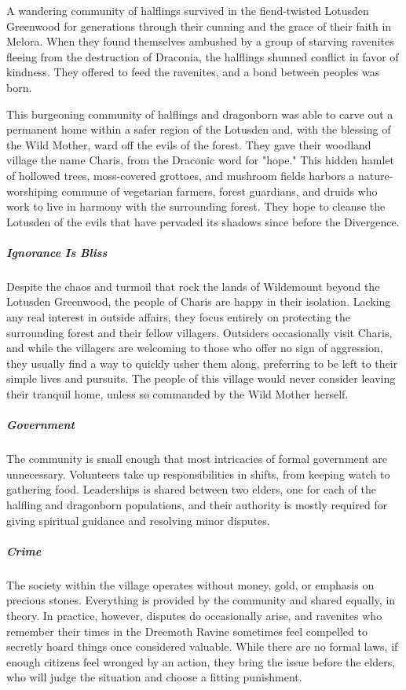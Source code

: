 \documentclass[10pt,a4paper,twoside,bg=print,twocolumn,openany,nodeprecatedcode]{dndbook}
\begin{document}
A wandering community of halflings survived in the fiend-twisted Lotusden Greenwood for generations through their cunning and the grace of their faith in Melora. When they found themselves ambushed by a group of starving ravenites fleeing from the destruction of Draconia, the halflings shunned conflict in favor of kindness. They offered to feed the ravenites, and a bond between peoples was born.

This burgeoning community of halflings and dragonborn was able to carve out a permanent home within a safer region of the Lotusden and, with the blessing of the Wild Mother, ward off the evils of the forest. They gave their woodland village the name Charis, from the Draconic word for "hope." This hidden hamlet of hollowed trees, moss-covered grottoes, and mushroom fields harbors a nature-worshiping commune of vegetarian farmers, forest guardians, and druids who work to live in harmony with the surrounding forest. They hope to cleanse the Lotusden of the evils that have pervaded its shadows since before the Divergence.

\subparagraph{Ignorance Is Bliss}
Despite the chaos and turmoil that rock the lands of Wildemount beyond the Lotusden Greenwood, the people of Charis are happy in their isolation. Lacking any real interest in outside affairs, they focus entirely on protecting the surrounding forest and their fellow villagers. Outsiders occasionally visit Charis, and while the villagers are welcoming to those who offer no sign of aggression, they usually find a way to quickly usher them along, preferring to be left to their simple lives and pursuits. The people of this village would never consider leaving their tranquil home, unless so commanded by the Wild Mother herself.

\subparagraph{Government}
The community is small enough that most intricacies of formal government are unnecessary. Volunteers take up responsibilities in shifts, from keeping watch to gathering food. Leaderships is shared between two elders, one for each of the halfling and dragonborn populations, and their authority is mostly required for giving spiritual guidance and resolving minor disputes.

\subparagraph{Crime}
The society within the village operates without money, gold, or emphasis on precious stones. Everything is provided by the community and shared equally, in theory. In practice, however, disputes do occasionally arise, and ravenites who remember their times in the Dreemoth Ravine sometimes feel compelled to secretly hoard things once considered valuable. While there are no formal laws, if enough citizens feel wronged by an action, they bring the issue before the elders, who will judge the situation and choose a fitting punishment.
\end{document}
